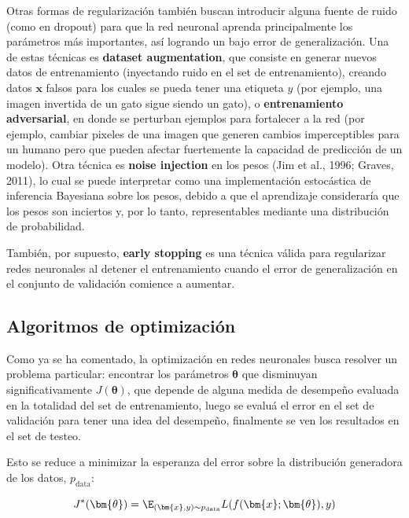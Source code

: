 Otras formas de regularizaci\'on tambi\'en buscan 
introducir alguna fuente de ruido (como en dropout) para que la red neuronal aprenda principalmente los par\'ametros m\'as importantes, as\'i logrando un bajo error de generalizaci\'on. Una de estas t\'ecnicas es \textbf{dataset augmentation}, que consiste en generar nuevos datos de entrenamiento (inyectando ruido en el set de entrenamiento), creando datos $\bm{x}$ falsos para los cuales se pueda tener una etiqueta $y$ (por ejemplo, una imagen invertida de un gato sigue siendo un gato), o \textbf{entrenamiento adversarial}, en donde se perturban ejemplos para fortalecer a la red (por ejemplo, cambiar pixeles de una imagen que generen cambios imperceptibles para un humano pero que pueden afectar fuertemente la capacidad de predicci\'on de un modelo). Otra t\'ecnica es \textbf{noise injection} en los pesos (Jim et al., 1996; Graves, 2011), lo cual se puede interpretar como una implementaci\'on estoc\'astica de inferencia Bayesiana sobre los pesos, debido a que el aprendizaje considerar\'ia que los pesos son inciertos y, por lo tanto, representables mediante una distribuci\'on de probabilidad.

Tambi\'en, por supuesto, \textbf{early stopping} es una t\'ecnica v\'alida para regularizar redes neuronales al detener el entrenamiento cuando el error de generalización en el conjunto de validación comience a aumentar.  

\subsection{Algoritmos de optimización}

Como ya se ha comentado, la optimizaci\'on en redes neuronales busca resolver un problema particular: encontrar los par\'ametros $\bm{\theta}$ que disminuyan significativamente $J(\bm{\theta})$, que depende de alguna medida de desempe{\~{n}}o evaluada en la totalidad del set de entrenamiento, luego se evaluá el error en el set de validaci\'on para tener una idea del desempeño, finalmente se ven los resultados en el set de testeo. 

Esto se reduce a minimizar la esperanza del error sobre la distribuci\'on generadora de los datos, $p_{\textrm{data}}$:


\begin{equation}
J^{*}(\bm{\theta}) = \E_{(\bm{x},y)\sim {p}_{\textrm{data}}}L(f(\bm{x};\bm{\theta}),y)
\label{gradiente_completo}
\end{equation}

